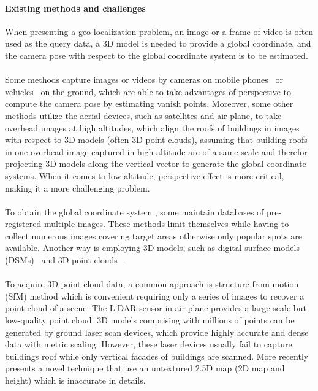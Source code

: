 \paragraph{Existing methods and challenges}
When presenting a geo-localization problem, an image or a frame of video is often used as the query data, a 3D model is needed to provide a global coordinate, and the camera pose with respect to the global coordinate system is to be estimated.
\\
\\
Some methods capture images or videos by cameras on mobile phones~\cite{Arth2015a, instant, Poglitsch2015, Liu2012} or vehicles~\cite{Taneja2015} on the ground, which are able to take advantages of perspective to compute the camera pose by estimating vanish points. %
Moreover, some other methods utilize the aerial devices, such as satellites and air plane, to take overhead images at high altitudes, which align the roofs of buildings in images with respect to 3D models (often 3D point clouds), assuming that building roofs in one overhead image captured in high altitude are of a same scale and therefor projecting 3D models along the vertical vector to generate the global coordinate systems. When it comes to low altitude, perspective effect is more critical, making it a more challenging problem.
\\
\\
To obtain the global coordinate system , some \cite{} maintain databases of pre-registered multiple images. These methods limit themselves while having to collect numerous images covering target areas otherwise only popular spots are available. Another way is employing 3D models, such as digital surface models (DSMs)~\cite{} and 3D point clouds~\cite{}.
\\

\\
To acquire 3D point cloud data, a common approach is structure-from-motion (SfM) method\cite{} which is convenient requiring only a series of images to recover a point cloud of a scene. The LiDAR sensor in air plane provides a large-scale but low-quality point cloud\cite{}. 3D models comprising with millions of points can be generated by ground laser scan devices, which provide highly accurate and dense data with metric scaling. However, these laser devices usually fail to capture buildings roof while only vertical facades of buildings are scanned.
%
More recently \cite{instant} presents a novel technique that use an untextured 2.5D map (2D map and height) which is  inaccurate in details.%
%
